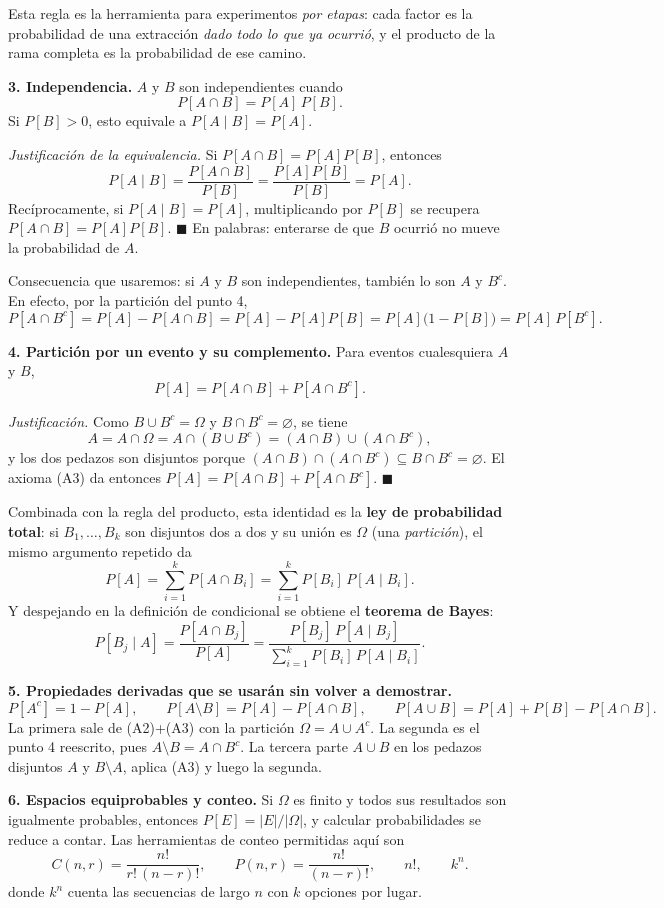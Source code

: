 \documentclass[11pt]{article}
\begin{document}
\begin{teo}
Esta regla es la herramienta para experimentos \emph{por etapas}: cada factor es la probabilidad de una extracci\'on \emph{dado todo lo que ya ocurri\'o}, y el producto de la rama completa es la probabilidad de ese camino.

\medskip
\textbf{3. Independencia.} $A$ y $B$ son independientes cuando
\[
P[A\cap B]=P[A]\,P[B].
\]
Si $P[B]>0$, esto equivale a $P[A\mid B]=P[A]$.

\emph{Justificaci\'on de la equivalencia.} Si $P[A\cap B]=P[A]P[B]$, entonces
\[
P[A\mid B]=\frac{P[A\cap B]}{P[B]}=\frac{P[A]P[B]}{P[B]}=P[A].
\]
Rec\'iprocamente, si $P[A\mid B]=P[A]$, multiplicando por $P[B]$ se recupera $P[A\cap B]=P[A]P[B]$. $\blacksquare$
En palabras: enterarse de que $B$ ocurri\'o no mueve la probabilidad de $A$.

Consecuencia que usaremos: si $A$ y $B$ son independientes, tambi\'en lo son $A$ y $B^{c}$. En efecto, por la partici\'on del punto 4,
\[
P[A\cap B^{c}]=P[A]-P[A\cap B]=P[A]-P[A]P[B]=P[A]\bigl(1-P[B]\bigr)=P[A]\,P[B^{c}].
\]

\medskip
\textbf{4. Partici\'on por un evento y su complemento.} Para eventos cualesquiera $A$ y $B$,
\[
P[A]=P[A\cap B]+P[A\cap B^{c}].
\]

\emph{Justificaci\'on.} Como $B\cup B^{c}=\Omega$ y $B\cap B^{c}=\varnothing$, se tiene
\[
A=A\cap\Omega=A\cap(B\cup B^{c})=(A\cap B)\cup(A\cap B^{c}),
\]
y los dos pedazos son disjuntos porque $(A\cap B)\cap(A\cap B^{c})\subseteq B\cap B^{c}=\varnothing$. El axioma (A3) da entonces $P[A]=P[A\cap B]+P[A\cap B^{c}]$. $\blacksquare$

Combinada con la regla del producto, esta identidad es la \textbf{ley de probabilidad total}: si $B_1,\dots,B_k$ son disjuntos dos a dos y su uni\'on es $\Omega$ (una \emph{partici\'on}), el mismo argumento repetido da
\[
P[A]=\sum_{i=1}^{k}P[A\cap B_i]=\sum_{i=1}^{k}P[B_i]\,P[A\mid B_i].
\]
Y despejando en la definici\'on de condicional se obtiene el \textbf{teorema de Bayes}:
\[
P[B_j\mid A]=\frac{P[A\cap B_j]}{P[A]}=\frac{P[B_j]\,P[A\mid B_j]}{\sum_{i=1}^{k}P[B_i]\,P[A\mid B_i]}.
\]

\medskip
\textbf{5. Propiedades derivadas que se usar\'an sin volver a demostrar.}
\[
P[A^{c}]=1-P[A],
\qquad
P[A\setminus B]=P[A]-P[A\cap B],
\qquad
P[A\cup B]=P[A]+P[B]-P[A\cap B].
\]
La primera sale de (A2)+(A3) con la partici\'on $\Omega=A\cup A^{c}$. La segunda es el punto 4 reescrito, pues $A\setminus B=A\cap B^{c}$. La tercera parte $A\cup B$ en los pedazos disjuntos $A$ y $B\setminus A$, aplica (A3) y luego la segunda.

\medskip
\textbf{6. Espacios equiprobables y conteo.} Si $\Omega$ es finito y todos sus resultados son igualmente probables, entonces $P[E]=|E|/|\Omega|$, y calcular probabilidades se reduce a contar. Las herramientas de conteo permitidas aqu\'i son
\[
C(n,r)=\frac{n!}{r!\,(n-r)!},
\qquad
P(n,r)=\frac{n!}{(n-r)!},
\qquad
n!,
\qquad
k^{n}.
\]
donde $k^{n}$ cuenta las secuencias de largo $n$ con $k$ opciones por lugar.
\end{teo}
\end{document}
